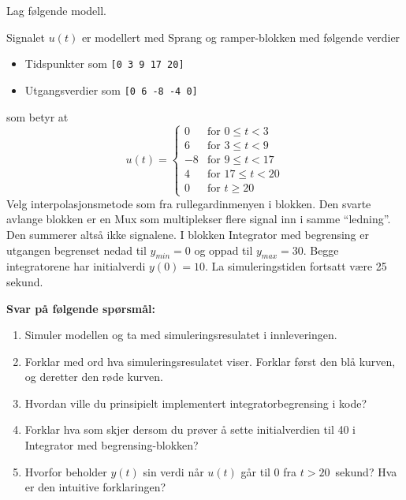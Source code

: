 
\item
  Lag følgende modell.
  \begin{figure}[H]
    \centering
    \hspace*{0mm}
  \end{figure}
 Signalet $u(t)$ er modellert med {\sf Sprang og
    ramper}-blokken med følgende verdier
  \begin{itemize}
  \item   {\sf Tidspunkter} som {\tt [0~3~9~17~20]}
    \item {\sf Utgangsverdier} som {\tt [0~6~-8~-4~0]} 
  \end{itemize}
  som betyr at
 \begin{equation}
    u(t) =
 \begin{cases}%
  0 & \text{for } 0 \leq t< 3\\
   6  & \text{for } 3 \leq t <9 \\
   -8  &  \text{for }9 \leq t <17 \\
   4  & \text{for } 17 \leq t <20 \\
   0  & \text{for } t \geq 20 
 \end{cases}
  \end{equation}
  Velg interpolasjonsmetode som  fra
    rullegardinmenyen i blokken.  
    Den svarte avlange blokken er en {\sf Mux} som multiplekser flere signal
  inn i samme ``ledning''. Den summerer altså ikke signalene. 
  I blokken {\sf Integrator med begrensing} er
  utgangen begrenset nedad til $y_{min}{=}0$ og oppad til $y_{max}{=}30$. 
   Begge integratorene har  initialverdi $y(0){=}10$. 
  {\color{red}La simuleringstiden fortsatt være 25 sekund.}


  
    {\bf Svar på følgende spørsmål:    }
  
  \begin{enumerate}[label=d\arabic*)]
  \item    Simuler modellen og ta med simuleringsresulatet
    i innleveringen.

\item Forklar med ord hva simuleringsresulatet viser. Forklar først
  den blå kurven, og deretter den røde kurven.

\item Hvordan ville du prinsipielt implementert
      integratorbegrensing i kode?

\item Forklar hva som skjer dersom du prøver å sette initialverdien
  til 40 i \\ {\sf Integrator med begrensing}-blokken?

\item   Hvorfor beholder  $y(t)$ sin verdi når $u(t)$ går
  til 0 fra $t{>}20$~sekund? Hva er den intuitive forklaringen?

\end{enumerate}

